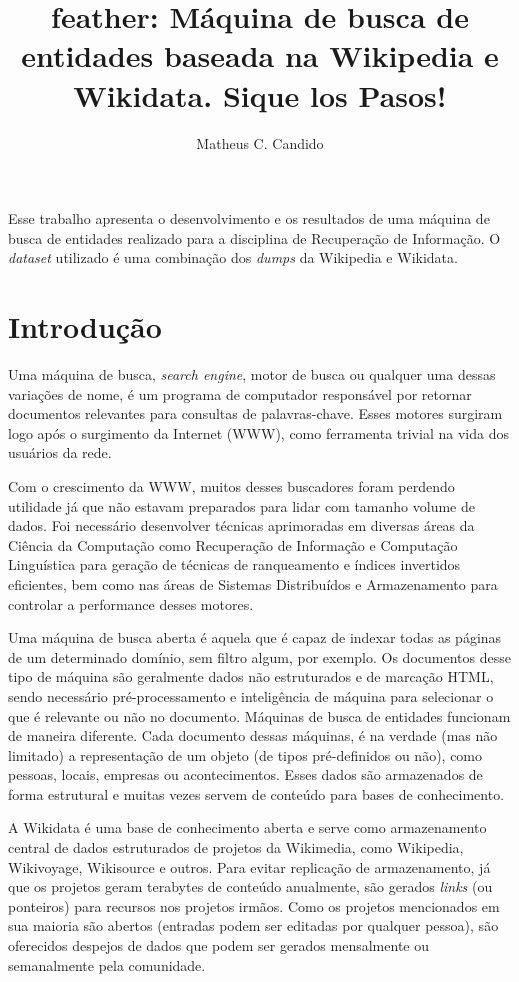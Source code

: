 \documentclass[12pt]{article}
\title{feather: Máquina de busca de entidades baseada na Wikipedia e Wikidata. Sique los Pasos!}
\author{Matheus C. Candido\inst{1}}
\begin{document}
 

\maketitle
     
\begin{resumo} 
  Esse trabalho apresenta o desenvolvimento e os resultados de uma máquina de busca de entidades realizado para a disciplina de Recuperação de Informação. O \emph{dataset} utilizado é uma combinação dos \emph{dumps} da Wikipedia e Wikidata.

\end{resumo}

\section{Introdução}

Uma máquina de busca, \emph{search engine}, motor de busca ou qualquer uma dessas variações de nome, é um programa de computador responsável por retornar documentos relevantes para consultas de palavras-chave. Esses motores surgiram logo após o surgimento da Internet (WWW), como ferramenta trivial na vida dos usuários da rede.

Com o crescimento da WWW, muitos desses buscadores foram perdendo utilidade já que não estavam preparados para lidar com tamanho volume de dados. Foi necessário desenvolver técnicas aprimoradas em diversas áreas da Ciência da Computação como Recuperação de Informação e Computação Linguística para geração de técnicas de ranqueamento e índices invertidos eficientes, bem como nas áreas de Sistemas Distribuídos e Armazenamento para controlar a performance desses motores.

Uma máquina de busca aberta é aquela que é capaz de indexar todas as páginas de um determinado domínio, sem filtro algum, por exemplo. Os documentos desse tipo de máquina são geralmente dados não estruturados e de marcação HTML, sendo necessário pré-processamento e inteligência de máquina para selecionar o que é relevante ou não no documento. Máquinas de busca de entidades funcionam de maneira diferente. Cada documento dessas máquinas, é na verdade (mas não limitado) a representação de um objeto (de tipos pré-definidos ou não), como pessoas, locais, empresas ou acontecimentos. Esses dados são armazenados de forma estrutural e muitas vezes servem de conteúdo para bases de conhecimento.

A Wikidata é uma base de conhecimento aberta e serve como armazenamento central de dados estruturados de projetos da Wikimedia, como Wikipedia, Wikivoyage, Wikisource e outros. Para evitar replicação de armazenamento, já que os projetos geram terabytes de conteúdo anualmente, são gerados \emph{links} (ou ponteiros) para recursos nos projetos irmãos. Como os projetos mencionados em sua maioria são abertos (entradas podem ser editadas por qualquer pessoa), são oferecidos despejos de dados que podem ser gerados mensalmente ou semanalmente pela comunidade.
\end{document}
